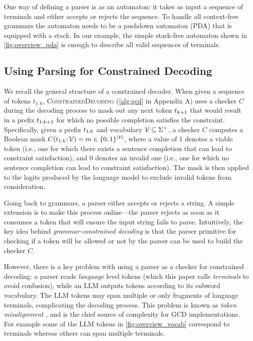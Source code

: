 One way of defining a parser is as an automaton: it takes as input a sequence of terminals and either accepts or rejects the sequence.
%
To handle all context-free grammars the automaton needs to be a pushdown automaton (PDA) that is equipped with a stack.
% 
In our example, the simple stack-free automaton shown in \autoref{fig:overview_pda} is enough to describe all valid sequences of terminals.

\subsection{Using Parsing for Constrained Decoding}
\label{sec:parsing-decoding}
We recall the general structure of a constrained decoder.
% 
When given a sequence of tokens $t_{1:k}$, \textsc{ConstrainedDecoding} (\autoref{alg:gcd} in Appendix A) uses a checker $C$ during the decoding process to mask out any next token $t_{k+1}$ that would result in a prefix $t_{1:k+1}$ for which no possible completion satisfies the constraint.
%
Specifically, given a prefix $t_{1:k}$ and vocabulary $\mathcal{V} \subseteq \Sigma^+$, a checker $C$ computes a Boolean mask 
$C(t_{1:k}; \mathcal{V})=m \in \{0, 1\}^{|\mathcal{V}|}$, where a value of 1 denotes a viable token (i.e., one for which there exists a sentence completion that can lead to constraint satisfaction), and 0 denotes an invalid one (i.e., one for which no sentence completion can lead to constraint satisfaction). The mask is then applied to the logits \cite{deutsch2019general} produced by the language model to exclude invalid tokens from consideration.

Going back to grammars, a parser either accepts or rejects a string. 
A simple extension is to make this process online---the parser rejects as soon as it consumes a token that will ensure the input string fails to parse. Intuitively, the key idea behind \textit{grammar-constrained decoding} is that the parser primitive for checking if a token will be allowed or not by the parser can be used to build the checker $C$.

However, there is a key problem with using a parser as a checker for constrained decoding: a parser reads  \textit{language} level tokens (which this paper calls \textit{terminals} to avoid confusion), while an LLM outputs tokens according to its subword vocabulary. The LLM tokens may span multiple or only fragments of language terminals, complicating the decoding process. This problem is known as 
\textit{token misalignment} \cite{poesia2022synchromesh}, and is the chief source of complexity for GCD implementations.
For example some of the LLM tokens in \autoref{fig:overview_vocab} correspond to terminals whereas others can span multiple terminals.

